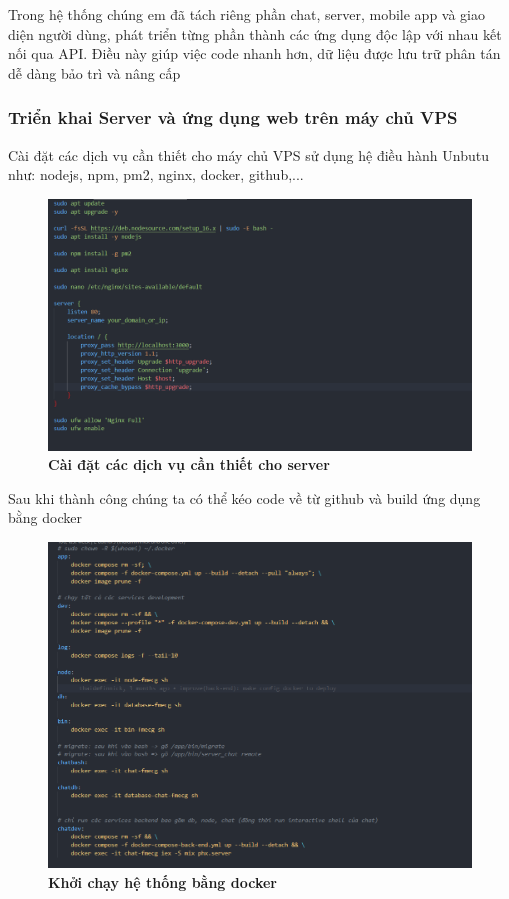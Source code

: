 Trong hệ thống chúng em đã tách riêng phần chat, server, mobile app và giao diện người dùng, phát triển từng phần thành các ứng dụng độc lập với nhau kết nối qua API. Điều này giúp việc code nhanh hơn, dữ liệu được lưu trữ phân tán dễ dàng bảo trì và nâng cấp 
\subsubsection{Triển khai Server và ứng dụng web trên máy chủ VPS}
  Cài đặt các dịch vụ cần thiết cho máy chủ VPS sử dụng hệ điều hành Unbutu như: nodejs, npm, pm2, nginx, docker, github,...

  \begin{figure}[H]
    \centering
    \includegraphics[scale=0.5]{Images/server/deploy/config_server.png}
    \caption[Cài đặt các dịch vụ cần thiết cho server]{\bfseries \fontsize{12pt}{0pt}
    \selectfont Cài đặt các dịch vụ cần thiết cho server}
    \label{create_server} %
  \end{figure}

  Sau khi thành công chúng ta có thể kéo code về từ github và build ứng dụng bằng docker 
  
  \begin{figure}[H]
    \centering
    \includegraphics[scale=0.5]{Images/server/deploy/docker-run.png}
    \caption[Khởi chạy hệ thống bằng docker]{\bfseries \fontsize{12pt}{0pt}
    \selectfont Khởi chạy hệ thống bằng docker}
    \label{docker-run} %
  \end{figure}

